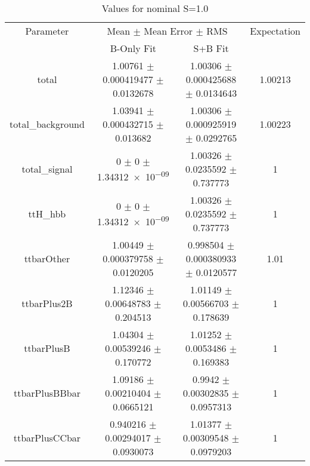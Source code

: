 \begin{table}
\centering
\caption{Values for nominal S=1.0}
\begin{tabular}{cccc}
\toprule
Parameter & \multicolumn{2}{c}{Mean $\pm$ Mean Error $\pm$ RMS} & Expectation\\
 & B-Only Fit & S+B Fit & \\
\midrule
total & \num{1.00761} $\pm$ \num{0.000419477} $\pm$ \num{0.0132678} & \num{1.00306} $\pm$ \num{0.000425688} $\pm$ \num{0.0134643} & \num{1.00213}\\
total\_background & \num{1.03941} $\pm$ \num{0.000432715} $\pm$ \num{0.013682} & \num{1.00306} $\pm$ \num{0.000925919} $\pm$ \num{0.0292765} & \num{1.00223}\\
total\_signal & \num{0} $\pm$ \num{0} $\pm$ \num{1.34312e-09} & \num{1.00326} $\pm$ \num{0.0235592} $\pm$ \num{0.737773} & \num{1}\\
ttH\_hbb & \num{0} $\pm$ \num{0} $\pm$ \num{1.34312e-09} & \num{1.00326} $\pm$ \num{0.0235592} $\pm$ \num{0.737773} & \num{1}\\
ttbarOther & \num{1.00449} $\pm$ \num{0.000379758} $\pm$ \num{0.0120205} & \num{0.998504} $\pm$ \num{0.000380933} $\pm$ \num{0.0120577} & \num{1.01}\\
ttbarPlus2B & \num{1.12346} $\pm$ \num{0.00648783} $\pm$ \num{0.204513} & \num{1.01149} $\pm$ \num{0.00566703} $\pm$ \num{0.178639} & \num{1}\\
ttbarPlusB & \num{1.04304} $\pm$ \num{0.00539246} $\pm$ \num{0.170772} & \num{1.01252} $\pm$ \num{0.0053486} $\pm$ \num{0.169383} & \num{1}\\
ttbarPlusBBbar & \num{1.09186} $\pm$ \num{0.00210404} $\pm$ \num{0.0665121} & \num{0.9942} $\pm$ \num{0.00302835} $\pm$ \num{0.0957313} & \num{1}\\
ttbarPlusCCbar & \num{0.940216} $\pm$ \num{0.00294017} $\pm$ \num{0.0930073} & \num{1.01377} $\pm$ \num{0.00309548} $\pm$ \num{0.0979203} & \num{1}\\
\bottomrule
\end{tabular}
\end{table}